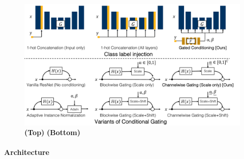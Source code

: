 \begin{figure}[t]
    \centering
    \includegraphics[width=\linewidth]{paper_images/arch.pdf}
    \caption{\textbf{(Top)} \textbf{(Bottom)}}\label{fig:arch}
\end{figure}

\paragraph{Architecture}

